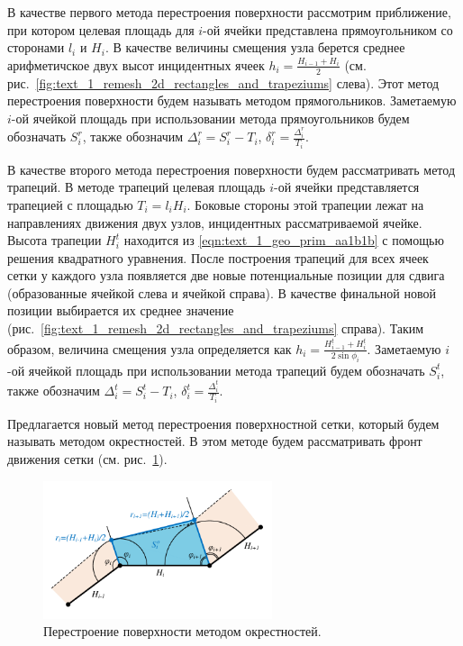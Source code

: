 В качестве первого метода перестроения поверхности рассмотрим приближение, при котором целевая площадь для $i$-ой ячейки представлена прямоугольником со сторонами $l_i$ и $H_i$.
В качестве величины смещения узла берется среднее арифметичское двух высот инцидентных ячеек $h_i = \frac{H_{i - 1} + H_i}{2}$ (см. рис.~\ref{fig:text_1_remesh_2d_rectangles_and_trapeziums} слева).
Этот метод перестроения поверхности будем называть методом прямогольников\label{term:method_remesh_rect}.
Заметаемую $i$-ой ячейкой площадь при использовании метода прямоугольников будем обозначать $S_i^r$, также обозначим $\Delta_i^r = S_i^r - T_i$, $\delta_i^r = \frac{\Delta_i^r}{T_i}$.

В качестве второго метода перестроения поверхности будем рассматривать метод трапеций\label{term:method_remesh_trap}.
В методе трапеций целевая площадь $i$-ой ячейки представляется трапецией с площадью $T_i = l_i H_i$.
Боковые стороны этой трапеции лежат на направлениях движения двух узлов, инцидентных рассматриваемой ячейке.
Высота трапеции $H_i^t$ находится из \eqref{eqn:text_1_geo_prim_aa1b1b} с помощью решения квадратного уравнения.
После построения трапеций для всех ячеек сетки у каждого узла появляется две новые потенциальные позиции для сдвига (образованные ячейкой слева и ячейкой справа).
В качестве финальной новой позиции выбирается их среднее значение (рис.~\ref{fig:text_1_remesh_2d_rectangles_and_trapeziums} справа).
Таким образом, величина смещения узла определяется как $h_i = \frac{H_{i - 1}^t + H_i^t}{2 \sin \phi_i}$.
Заметаемую $i$-ой ячейкой площадь при использовании метода трапеций будем обозначать $S_i^t$, также обозначим $\Delta_i^t = S_i^t - T_i$, $\delta_i^t = \frac{\Delta_i^t}{T_i}$.

Предлагается новый метод перестроения поверхностной сетки, который будем называть методом окрестностей\label{term:method_remesh_okr3}.
В этом методе будем рассматривать фронт движения сетки (см. рис.~\ref{fig:text_1_remesh_2d_okrestnost}).

\begin{figure}[ht]
\centering
\includegraphics[width=0.6\textwidth]{pics/text_1_remesh_2d/remesh_okrestnost.pdf}
\singlespacing
{}\caption{Перестроение поверхности методом окрестностей.}
\label{fig:text_1_remesh_2d_okrestnost}
\end{figure}

